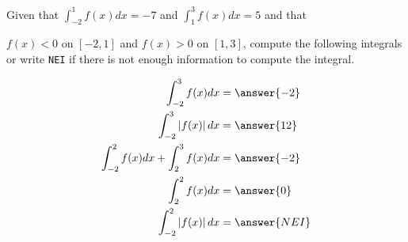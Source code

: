 \documentclass{ximera}
\author{Nela Lakos \and Kyle Parsons}
\begin{document}
\begin{exercise}

Given that $\int_{-2}^1 f(x) dx = -7$ and $\int_1^3 f(x) dx = 5$ and that

 $f(x) < 0$ on $[-2,1]$ and $f(x) > 0$ on $[1,3]$,  compute the following integrals or write \verb|NEI| if there is not enough information to compute the integral.

\begin{align*}
\int_{-2}^3 f(x) dx &= \answer{-2}\\
\int_{-2}^3 \left|f(x)\right| dx &= \answer{12}\\
\int_{-2}^2 f(x) dx + \int_2^3 f(x) dx &= \answer{-2}\\
\int_2^2 f(x) dx &= \answer{0}\\
\int_{-2}^2 \left|f(x)\right| dx &= \answer{NEI}
\end{align*}

\end{exercise}
\end{document}
